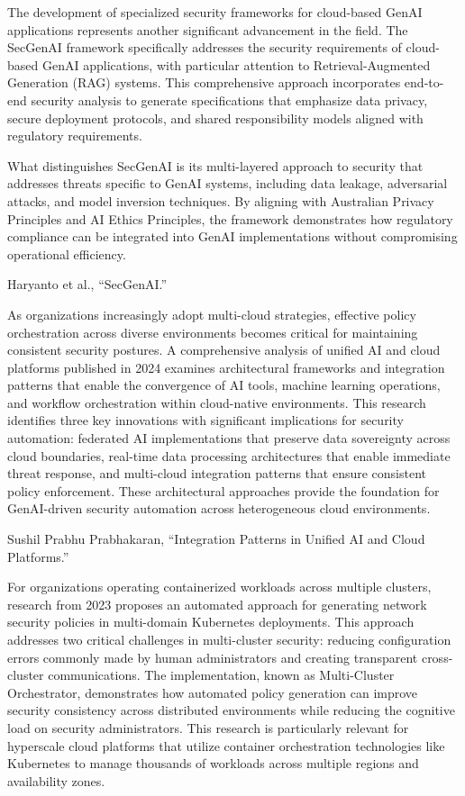 The development of specialized security frameworks for cloud-based GenAI applications represents another significant advancement in the field. The SecGenAI framework specifically addresses the security requirements of cloud-based GenAI applications, with particular attention to Retrieval-Augmented Generation (RAG) systems. This comprehensive approach incorporates end-to-end security analysis to generate specifications that emphasize data privacy, secure deployment protocols, and shared responsibility models aligned with regulatory requirements.

What distinguishes SecGenAI is its multi-layered approach to security that addresses threats specific to GenAI systems, including data leakage, adversarial attacks, and model inversion techniques. By aligning with Australian Privacy Principles and AI Ethics Principles, the framework demonstrates how regulatory compliance can be integrated into GenAI implementations without compromising operational efficiency.

Haryanto et al., “SecGenAI.”

As organizations increasingly adopt multi-cloud strategies, effective policy orchestration across diverse environments becomes critical for maintaining consistent security postures. A comprehensive analysis of unified AI and cloud platforms published in 2024 examines architectural frameworks and integration patterns that enable the convergence of AI tools, machine learning operations, and workflow orchestration within cloud-native environments.
This research identifies three key innovations with significant implications for security automation: federated AI implementations that preserve data sovereignty across cloud boundaries, real-time data processing architectures that enable immediate threat response, and multi-cloud integration patterns that ensure consistent policy enforcement. These architectural approaches provide the foundation for GenAI-driven security automation across heterogeneous cloud environments.

Sushil Prabhu Prabhakaran, “Integration Patterns in Unified AI and Cloud Platforms.”

For organizations operating containerized workloads across multiple clusters, research from 2023 proposes an automated approach for generating network security policies in multi-domain Kubernetes deployments. This approach addresses two critical challenges in multi-cluster security: reducing configuration errors commonly made by human administrators and creating transparent cross-cluster communications.
The implementation, known as Multi-Cluster Orchestrator, demonstrates how automated policy generation can improve security consistency across distributed environments while reducing the cognitive load on security administrators. This research is particularly relevant for hyperscale cloud platforms that utilize container orchestration technologies like Kubernetes to manage thousands of workloads across multiple regions and availability zones.

